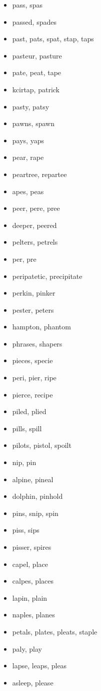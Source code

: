 \documentclass[a4wide,11pt]{report}
\begin{document}
\begin{itemize}
  \item pass, spas
  \item passed, spades
  \item past, pats, spat, stap, taps
  \item pasteur, pasture
  \item pate, peat, tape
  \item kcirtap, patrick
  \item pasty, patsy
  \item pawns, spawn
  \item pays, yaps
  \item pear, rape
  \item peartree, repartee
  \item apes, peas
  \item peer, pere, pree
  \item deeper, peered
  \item pelters, petrels
  \item per, pre
  \item peripatetic, precipitate
  \item perkin, pinker
  \item pester, peters
  \item hampton, phantom
  \item phrases, shapers
  \item pieces, specie
  \item peri, pier, ripe
  \item pierce, recipe
  \item piled, plied
  \item pills, spill
  \item pilots, pistol, spoilt
  \item nip, pin
  \item alpine, pineal
  \item dolphin, pinhold
  \item pins, snip, spin
  \item piss, sips
  \item pisser, spires
  \item capel, place
  \item calpes, places
  \item lapin, plain
  \item naples, planes
  \item petals, plates, pleats, staple
  \item paly, play
  \item lapse, leaps, pleas
  \item asleep, please

\end{itemize}
\end{document}
